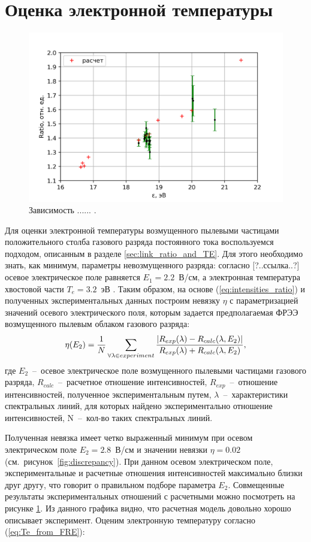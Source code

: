 \section{Оценка электронной температуры}
\begin{figure}[t]
  \centering
  \includegraphics[width=16cm]{figures/Intensities_ratio}
  \caption{Зависимость ...... .}
  \label{fig:Intensities_ratio}
\end{figure}

Для оценки электронной температуры возмущенного пылевыми частицами положительного столба газового разряда постоянного
тока воспользуемся подходом, описанным в разделе \ref{sec:link_ratio_and_TE}. Для этого необходимо знать, как минимум,
параметры невозмущенного разряда: согласно [?..ссылка..?] осевое электрическое поле равняется $E_1 = 2.2$~В/см, а
электронная температура хвостовой части $T_e = 3.2$~эВ \cite{Zobnin2018}. Таким образом, на основе
(\ref{eq:intensities_ratio}) и полученных экспериментальных данных построим невязку $\eta$ с параметризацией значений
осевого электрического поля, которым задается предполагаемая ФРЭЭ возмущенного пылевым облаком газового разряда:
\begin{equation}
    \eta(E_2) = {1 \over N} \sum_{\forall \lambda \in experiment}{|R_{exp}(\lambda) - R_{calc}(\lambda, E_2)| \over {R_{exp}(\lambda) + R_{calc}(\lambda, E_2)}},
\end{equation}
где $E_2$~--~осевое электрическое поле возмущенного пылевыми частицами газового разряда, $R_{calc}$~--~расчетное
отношение интенсивностей, $R_{exp}$~--~отношение интенсивностей, полученное экспериментальным путем, $\lambda$~--~характеристики
спектральных линий, для которых найдено экспериментально отношение интенсивностей, N~--~кол-во таких спектральных линий.

Полученная невязка имеет четко выраженный минимум при осевом электрическом
поле $E_2 = 2.8$~В/см и значении невязки $\eta = 0.02$ (см.~рисунок~\ref{fig:discrepancy}).
При данном осевом электрическом поле, экспериментальные и расчетные отношения интенсивностей максимально близки друг другу,
что говорит о правильном подборе параметра $E_2$.
Совмещенные результаты экспериментальных отношений с расчетными можно посмотреть на рисунке \ref{fig:Intensities_ratio}.
Из данного графика видно, что расчетная модель довольно хорошо описывает эксперимент. Оценим электронную температуру
согласно (\ref{eq:Te_from_FRE}):

